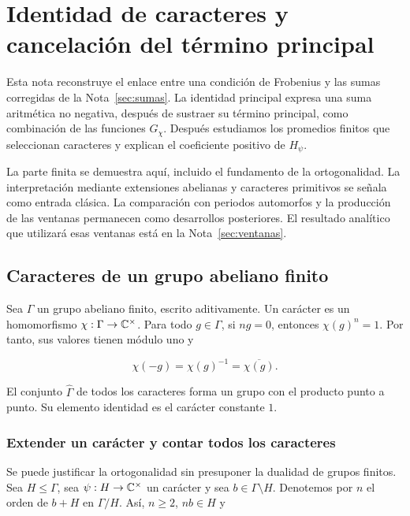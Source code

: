 \section{Identidad de caracteres y cancelación del término principal}
\label{sec:caracteres}

Esta nota reconstruye el enlace entre una condición de Frobenius y las sumas corregidas de la Nota~\ref{sec:sumas}. La identidad principal expresa una suma aritmética no negativa, después de sustraer su término principal, como combinación de las funciones $G_\chi$. Después estudiamos los promedios finitos que seleccionan caracteres y explican el coeficiente positivo de $H_\psi$.


La parte finita se demuestra aquí, incluido el fundamento de la ortogonalidad. La interpretación mediante extensiones abelianas y caracteres primitivos se señala como entrada clásica. La comparación con periodos automorfos y la producción de las ventanas permanecen como desarrollos posteriores. El resultado analítico que utilizará esas ventanas está en la Nota~\ref{sec:ventanas}.

\subsection{Caracteres de un grupo abeliano finito}

Sea $\Gamma$ un grupo abeliano finito, escrito aditivamente. Un carácter es un homomorfismo $\chi:\Gamma\to\mathbb{C}^\times$. Para todo $g\in\Gamma$, si $ng=0$, entonces $\chi(g)^n=1$. Por tanto, sus valores tienen módulo uno y

\[
\chi(-g)=\chi(g)^{-1}=\overline{\chi(g)}.
\]

El conjunto $\widehat\Gamma$ de todos los caracteres forma un grupo con el producto punto a punto. Su elemento identidad es el carácter constante $1$.

\subsubsection*{Extender un carácter y contar todos los caracteres}

Se puede justificar la ortogonalidad sin presuponer la dualidad de grupos finitos. Sea $H\le\Gamma$, sea $\psi:H\to\mathbb{C}^\times$ un carácter y sea $b\in\Gamma\setminus H$. Denotemos por $n$ el orden de $b+H$ en $\Gamma/H$. Así, $n\ge2$, $nb\in H$ y

